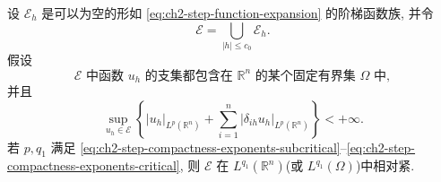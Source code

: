 \begin{Theorem}
\label{thm:ch2-discrete-compactness-step}
设 $\mathcal E_h$ 是可以为空的形如 \eqref{eq:ch2-step-function-expansion} 的阶梯函数族, 并令
\begin{equation}
\mathcal E=\bigcup_{|h|\leq c_0}\mathcal E_h.
\label{eq:ch2-step-family-union}
\end{equation}
假设
\begin{equation}
\mathcal E\text{ 中函数 }u_h\text{ 的支集都包含在 }\mathbb R^n
\text{ 的某个固定有界集 }\Omega\text{ 中},
\label{eq:ch2-step-family-fixed-support}
\end{equation}
并且
\begin{equation}
\sup_{u_h\in\mathcal E}
\left\{|u_h|_{L^p(\mathbb R^n)}
+\sum_{i=1}^{n}|\delta_{ih}u_h|_{L^p(\mathbb R^n)}\right\}<+\infty.
\label{eq:ch2-step-family-uniform-bound}
\end{equation}
若 $p,q_1$ 满足 \eqref{eq:ch2-step-compactness-exponents-subcritical}--\eqref{eq:ch2-step-compactness-exponents-critical}, 则 $\mathcal E$ 在 $L^{q_1}(\mathbb R^n)$(或 $L^{q_1}(\Omega)$)中相对紧.
\end{Theorem}

